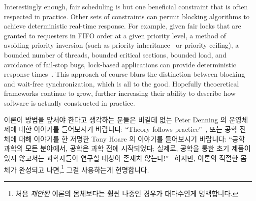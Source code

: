 Interestingly enough, fair scheduling is but one beneficial
constraint that is often respected in practice.
Other sets of constraints can permit blocking algorithms to
achieve deterministic real-time response.
For example, given fair locks that are granted to requesters in FIFO order at
a given priority level,
a method of avoiding priority inversion (such as priority
inheritance~\cite{Takada:1995:RSN:527074.828566,Cai-DongWang1996PrioInherLock}
or priority ceiling), a bounded number of threads,
bounded critical sections,
bounded load,
and avoidance of fail-stop bugs,
lock-based applications can provide deterministic
response times~\cite{BjoernBrandenburgPhD,DipankarSarma2004OLSscalability}.
This approach of course blurs the distinction between blocking and wait-free
synchronization, which is all to the good.
Hopefully theoeretical frameworks continue to grow, further increasing
their ability to
describe how software is actually constructed in practice.
\fi

이론이 방법을 앞서야 한다고 생각하는 분들은 비길데 없는 Peter Denning 의
운영체제에 대한 이야기를 들어보시기 바랍니다:
``Theory follows practice''~\cite{Denning:2015:POF:2830903.2830904},
또는 공학 전체에 대해 이야기를 한 저명한 Tony Hoare 의 이야기를 들어보시기
바랍니다:
``공학 과학의 모든 분야에서, 공학은 과학 전에 시작되었다; 실제로, 공학을 통한
초기 제품이 있지 않고서는 과학자들이 연구할 대상이 존재치
않는다!''~\cite{RichardMorris2007TonyHoareInterview}
하지만, 이론의 적절한 몸체가 완성되고 나면,\footnote{
	처음 \emph{제안된} 이론의 몸체보다는 훨씬 나중인 경우가 대다수인게
	명백합니다.}
그걸 사용하는게 현명합니다.
\iffalse

Those who feel that theory should lead the way are referred to the
inimitable Peter Denning, who said of operating systems:
``Theory follows practice''~\cite{Denning:2015:POF:2830903.2830904},
or to the eminent Tony Hoare, who said of the whole of engineering:
``In all branches of engineering science, the engineering starts before
the science; indeed, without the early products of engineering, there
would be nothing for the scientist to
study!''~\cite{RichardMorris2007TonyHoareInterview}
However, once an appropriate body of theory becomes available,\footnote{
	Admittedly often much later than the first \emph{proposed}
	body of theory.}
it is wise to make use of it.
\fi


